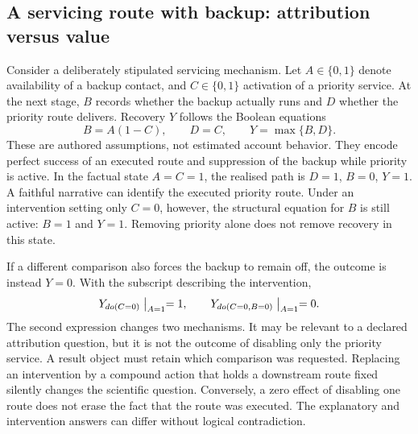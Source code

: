 \subsection{A servicing route with backup: attribution versus value}
\label{exec18:reasoning-example}
Consider a deliberately stipulated servicing mechanism. Let $A\in\{0,1\}$
denote availability of a backup contact, and $C\in\{0,1\}$ activation of a
priority service. At the next stage, $B$ records whether the backup actually
runs and $D$ whether the priority route delivers. Recovery $Y$ follows the
Boolean equations
\begin{equation}
 B=A(1-C),\qquad D=C,\qquad Y=\max\{B,D\}.
 \label{exec18:reasoning-mechanism}
\end{equation}
These are authored assumptions, not estimated account behavior. They encode
perfect success of an executed route and suppression of the backup while
priority is active. In the factual state $A=C=1$, the realised path is
$D=1$, $B=0$, $Y=1$. A faithful narrative can identify the executed priority
route. Under an intervention setting only $C=0$, however, the structural
equation for $B$ is still active: $B=1$ and $Y=1$. Removing priority alone
does not remove recovery in this state.~\citep{exec18_reasoning_reference}

If a different comparison also forces the backup to remain off, the outcome
is instead $Y=0$. With the subscript describing the intervention,
\begin{equation}
 Y_{do(C=0)}\bigm|_{A=1}=1,\qquad
 Y_{do(C=0,B=0)}\bigm|_{A=1}=0.
 \label{exec18:reasoning-interventions}
\end{equation}
The second expression changes two mechanisms. It may be relevant to a
declared attribution question, but it is not the outcome of disabling only
the priority service. A result object must retain which comparison was
requested. Replacing an intervention by a compound action that holds a
downstream route fixed silently changes the scientific question. Conversely,
a zero effect of disabling one route does not erase the fact that the route
was executed. The explanatory and intervention answers can differ without
logical contradiction.

